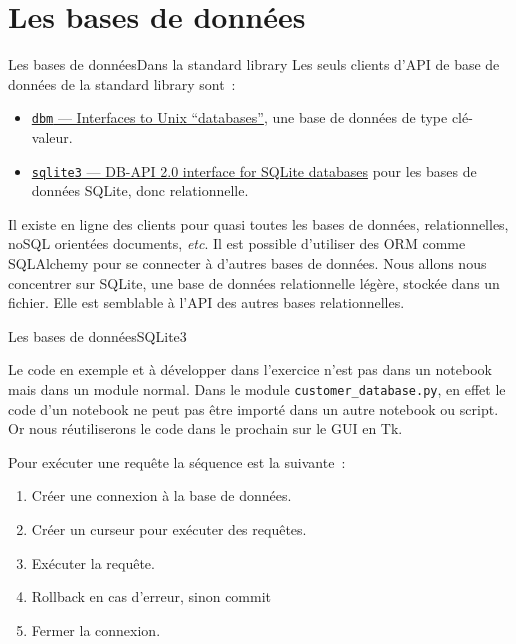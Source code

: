 \documentclass{beamer}
\begin{document}
    \section{Les bases de données}\label{sec:database}

    \begin{frame}{Les bases de données}{Dans la standard library}
        Les seuls clients d'API de base de données de la standard library sont~:
        \begin{itemize}
            \item \href{https://docs.python.org/3/library/dbm.html}{\lstinline{dbm} — Interfaces to Unix “databases”}, une base de données de type clé-valeur.
            \item \href{https://docs.python.org/3/library/sqlite3.html}{\lstinline{sqlite3} — DB-API 2.0 interface for SQLite databases} pour les bases de données SQLite, donc relationnelle.
        \end{itemize}
        \bigbreak
        Il existe en ligne des clients pour quasi toutes les bases de données, relationnelles, noSQL orientées documents, \textit{etc}.
        Il est possible d'utiliser des ORM comme SQLAlchemy pour se connecter à d'autres bases de données.
        \bigbreak
        Nous allons nous concentrer sur SQLite, une base de données relationnelle légère, stockée dans un fichier.
        Elle est semblable à l'API des autres bases relationnelles.
    \end{frame}

    \begin{frame}{Les bases de données}{SQLite3}
        \begin{dangercolorbox}
            Le code en exemple et à développer dans l'exercice n'est pas dans un notebook mais dans un module normal.
            Dans le module \lstinline{customer_database.py}, en effet le code d'un notebook ne peut pas être importé dans un autre notebook ou script.
            Or nous réutiliserons le code dans le prochain sur le GUI en Tk.
        \end{dangercolorbox}
        \bigbreak
        Pour exécuter une requête la séquence est la suivante~:
        \begin{enumerate}
            \item Créer une connexion à la base de données.
            \item Créer un curseur pour exécuter des requêtes.
            \item Exécuter la requête.
            \item Rollback en cas d'erreur, sinon commit
            \item Fermer la connexion.
        \end{enumerate}
    \end{frame}
\end{document}
